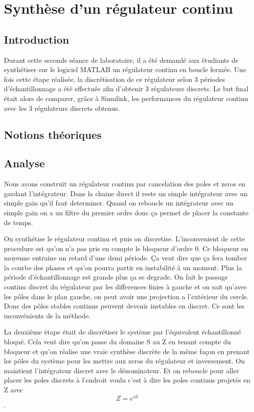 \chapter{Synthèse d'un régulateur continu}

\section{Introduction}
Durant cette seconde séance de laboratoire, il a été demandé aux étudiants de synthétiser sur le logiciel MATLAB un régulateur continu en boucle fermée. Une fois cette étape réalisée, la discrétisation de ce régulateur selon 3 périodes d'échantillonnage a été effectuée afin d'obtenir 3 régulateurs discrets. Le but final était alors de comparer, grâce à Simulink, les performances du régulateur continu avec les 3 régulateurs discrets obtenus. 

\section{Notions théoriques}


\section{Analyse}
Nous avons construit un régulateur continu par cancelation des poles et zeros en gardant l’intégrateur. Dans la chaine direct il reste un simple intégrateur avec un simple gain qu’il faut determiner. Quand on reboucle un intégrateur avec un simple gain on a un filtre du premier ordre donc ça permet de placer la constante de temps.

On synthétise le régulateur continu et puis on discretise. L’inconvenient de cette procedure est qu'on n’a pas pris en compte le bloqueur d’ordre 0.
Ce bloqueur en moyenne entraine un retard d’une demi période. Ça veut dire que ça fera tomber la courbe des phases et qu’on pourra partir en instabilité à un moment.
Plus la période d’échantillonnage est grande plus ça se degrade.
On fait le passage continu discret du régulateur par les differences finies à gauche et on sait qu'avec les pôles dans le plan gauche, on peut avoir une projection a l’extérieur du cercle. Donc des pôles stables continus peuvent devenir instables en discret. Ce sont les inconvénients de la méthode.

La deuxième étape était de discrétiser le système par l’équivalent échantillonné bloqué. Cela veut dire qu’on passe du domaine S au Z en tenant compte du bloqueur et qu'on réalise une vraie synthèse discrète de la même façon en prenant les pôles du système pour les mettre aux zeros du régulateur et inversement. On maintient l’intégrateur discret avec le dénominateur. Et on reboucle pour aller placer les poles discrets à l’endroit voulu c’est à dire les poles continus projetés en Z avec \[Z=e^{sh}\].



